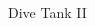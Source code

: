 \documentclass{beamer}
\begin{document}
\begin{frame}[t]{Dive Tank II}
\begin{columns}[T]
\begin{column}{0.5\textwidth}
\begin{center}
				\end{center}
			\end{column}
		\end{columns}
	\end{frame}
\end{document}
